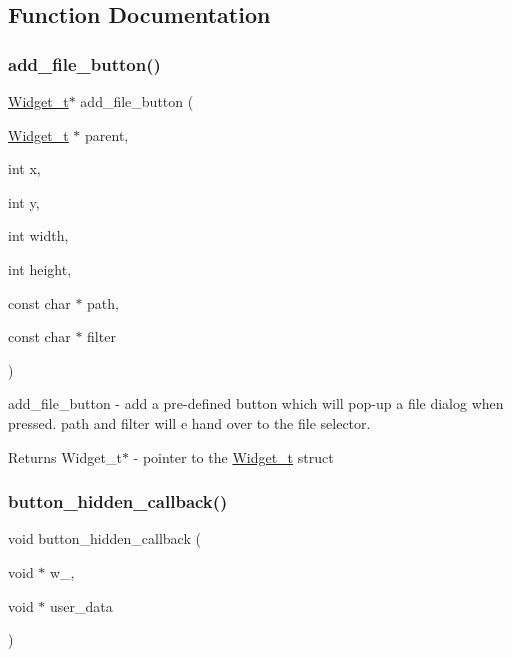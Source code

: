 \subsection{Function Documentation}
\mbox{\label{xfile-dialog_8c_aa38720181c2a046546d345b60eb6b7b0}} 
\subsubsection{\texorpdfstring{add\+\_\+file\+\_\+button()}{add\_file\_button()}}
{\footnotesize\ttfamily \hyperlink{structWidget__t}{Widget\+\_\+t}$\ast$ add\+\_\+file\+\_\+button (\begin{DoxyParamCaption}\item[{\hyperlink{structWidget__t}{Widget\+\_\+t} $\ast$}]{parent,  }\item[{int}]{x,  }\item[{int}]{y,  }\item[{int}]{width,  }\item[{int}]{height,  }\item[{const char $\ast$}]{path,  }\item[{const char $\ast$}]{filter }\end{DoxyParamCaption})}



add\+\_\+file\+\_\+button -\/ add a pre-\/defined button which will pop-\/up a file dialog when pressed. path and filter will e hand over to the file selector. 

\begin{DoxyReturn}{Returns}
Widget\+\_\+t$\ast$ -\/ pointer to the \hyperlink{structWidget__t}{Widget\+\_\+t} struct 
\end{DoxyReturn}
\mbox{\label{xfile-dialog_8c_ab93b20c7d062937b7a8735d7fdcb8c4d}} 
\subsubsection{\texorpdfstring{button\+\_\+hidden\+\_\+callback()}{button\_hidden\_callback()}}
{\footnotesize\ttfamily void button\+\_\+hidden\+\_\+callback (\begin{DoxyParamCaption}\item[{void $\ast$}]{w\+\_\+,  }\item[{void $\ast$}]{user\+\_\+data }\end{DoxyParamCaption})}

